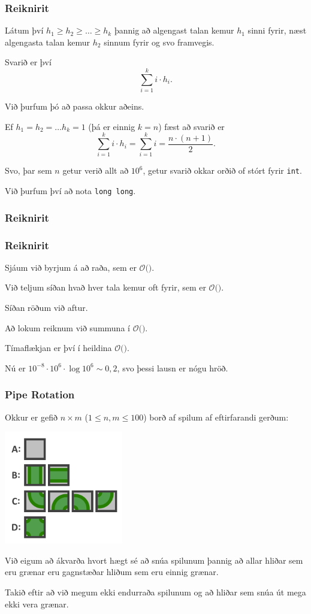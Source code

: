 {
	\frametitle{Reiknirit}
	{
		\item<1-> Látum því $h_1 \geq h_2 \geq \dots \geq h_k$ þannig að algengast talan kemur $h_1$ sinni fyrir,
					næst algengasta talan kemur $h_2$ sinnum fyrir
					og svo framvegis.
		\item<2-> Svarið er því
		\[
			\sum_{i = 1}^k i \cdot h_i.
		\]
		\item<3-> Við þurfum þó að passa okkur aðeins.
		\item<4-> Ef $h_1 = h_2 = \dots h_k = 1$ (þá er einnig $k = n$) fæst að svarið er
		\[
			\sum_{i = 1}^k i \cdot h_i
			=
			\sum_{i = 1}^k i
			=
			\frac{n \cdot (n + 1)}{2}.
		\]
		\item<5-> Svo, þar sem $n$ getur verið allt að $10^6$, getur svarið okkar orðið of stórt fyrir \texttt{int}.
		\item<6-> Við þurfum því að nota \texttt{long long}.
	}
}

{
	\frametitle{Reiknirit}
}

{
	\frametitle{Reiknirit}
	{
		\item<1-> Sjáum við byrjum á að raða, sem er $\mathcal{O}($\onslide<2->{$n \log n$}$)$.
		\item<3-> Við teljum síðan hvað hver tala kemur oft fyrir, sem er $\mathcal{O}($\onslide<4->{$\ n\ $}$)$.
		\item<5-> Síðan röðum við aftur.
		\item<6-> Að lokum reiknum við summuna í $\mathcal{O}($\onslide<7->{$\ n\ $}$)$.
		\item<8-> Tímaflækjan er því í heildina $\mathcal{O}($\onslide<9->{$n \log n$}$)$.
		\item<10-> Nú er $10^{-8} \cdot 10^6 \cdot \log 10^6 \sim 0,2$, svo þessi lausn er nógu hröð.
	}
}

{
	\frametitle{Pipe Rotation}
	{
		\item<1-> Okkur er gefið $n \times m$ ($1 \leq n, m \leq 100$) borð af spilum af eftirfarandi gerðum:
		\item<2->[] \includegraphics[scale = 0.25]{fig/pr1}
		\item<3-> Við eigum að ákvarða hvort hægt sé að snúa spilunum þannig að allar hliðar sem eru grænar eru gagnstæðar hliðum sem eru einnig grænar.
		\item<4-> Takið eftir að við megum ekki endurraða spilunum og að hliðar sem snúa út mega ekki vera grænar.
	}
}

